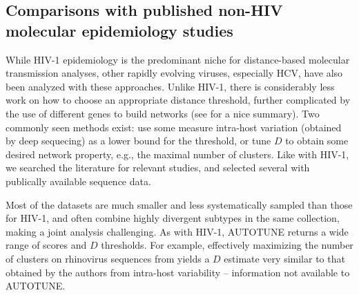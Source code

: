 \documentclass[utf8]{FrontiersinHarvard} %
\begin{document}
\subsection{Comparisons with published non-HIV molecular epidemiology studies}

While HIV-1 epidemiology is the predominant niche for distance-based molecular transmission analyses, other rapidly evolving viruses, especially HCV, have also been analyzed with these approaches. Unlike HIV-1, there is considerably less work on how to choose an appropriate distance threshold, further complicated by the use of different genes to build networks (see \citet{Chan:2020aa} for a nice summary). Two commonly seen methods exist: use some measure intra-host variation (obtained by deep sequecing) as a lower bound for the threshold, or tune $D$ to obtain some desired network property, e.g., the maximal number of clusters. Like with HIV-1, we searched the literature for relevant studies, and selected several with publically available sequence data.  

Most of the datasets are much smaller and less systematically sampled than those for HIV-1, and often combine highly divergent subtypes in the same collection, making a joint analysis challenging. As with HIV-1, AUTOTUNE returns a wide range of scores and $D$ thresholds. For example, effectively maximizing the number of clusters on rhinovirus sequences from \citet{Ng:2022aa} yields a $D$ estimate very similar to that obtained by the authors from intra-host variability -- information not available to AUTOTUNE.
\end{document}
